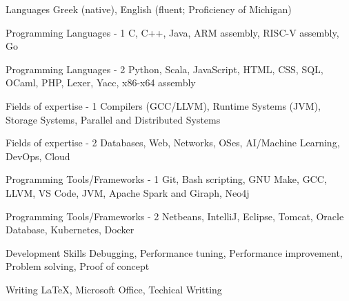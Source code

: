 

\begin{cvskills}

  \cvskill
    {Languages} %
    {Greek (native), English (fluent; Proficiency of Michigan)} %

  \cvskill
    {Programming Languages - 1} %
    {C, C++, Java, ARM assembly, RISC-V assembly, Go} %

  \cvskill
    {Programming Languages - 2} %
    {Python, Scala, JavaScript, HTML, CSS, SQL, OCaml, PHP, Lexer, Yacc, x86-x64 assembly}

  \cvskill
    {Fields of expertise - 1} %
    {Compilers (GCC/LLVM), Runtime Systems (JVM), Storage Systems, Parallel and Distributed Systems} %
    
  \cvskill
    {Fields of expertise - 2} %
    {Databases, Web, Networks, OSes, AI/Machine Learning, DevOps, Cloud}

  \cvskill
    {Programming Tools/Frameworks - 1} %
    {Git, Bash scripting, GNU Make, GCC, LLVM, VS Code, JVM, Apache Spark and Giraph, Neo4j}

  \cvskill
    {Programming Tools/Frameworks - 2} %
    {Netbeans, IntelliJ, Eclipse, Tomcat, Oracle Database, Kubernetes, Docker} %

  \cvskill
    {Development Skills} %
    {Debugging, Performance tuning, Performance improvement, Problem solving, Proof of concept} %

  \cvskill
    {Writing} %
    {LaTeX, Microsoft Office, Techical Writting} %

\end{cvskills}
